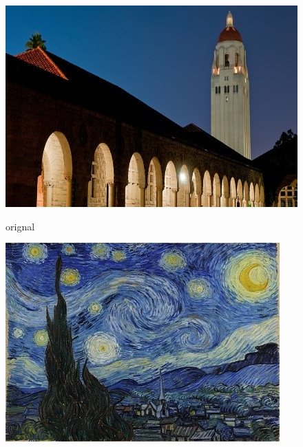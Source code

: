 \documentclass[12pt]{article}
\begin{document}
	
	\begin{figure}[H]
		
		\begin{minipage}{0.32\linewidth}
			\vspace{3pt}
			\centerline{\includegraphics[width=\textwidth]{images/Figure5-1.jpg}}
			\centerline{orignal}
		\end{minipage}
		\begin{minipage}{0.32\linewidth}
			\vspace{3pt}
			\centerline{\includegraphics[width=\textwidth]{images/Figure5-2.jpg}}
			

\end{minipage}
\end{figure}
\end{document}
